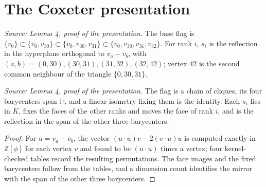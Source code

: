 \section{The Coxeter presentation}

\begin{definition}
  \label{def:walls}
  \leanok
  \textit{Source: Lemma 4, proof of the presentation.}
  The base flag is
  \(\{v_0\}\subset\{v_0,v_{30}\}\subset\{v_0,v_{30},v_{31}\}\subset
  \{v_0,v_{30},v_{31},v_{32}\}\). For rank \(i\), \(s_i\) is the
  reflection in the hyperplane orthogonal to \(v_a-v_b\), with
  \((a,b)=(0,30),(30,31),(31,32),(32,42)\); vertex \(42\) is the second
  common neighbour of the triangle \(\{0,30,31\}\).
\end{definition}

\begin{theorem}
  \label{thm:chamber-walls}
  \leanok
  \textit{Source: Lemma 4, proof of the presentation.}
  The flag is a chain of cliques, its four barycenters span \(\mathbb H\),
  and a linear isometry fixing them is the identity. Each \(s_i\) lies in
  \(K\), fixes the faces of the other ranks and moves the face of rank
  \(i\), and is the reflection in the span of the other three
  barycenters.
\end{theorem}
\begin{proof}
  \leanok
  For \(u=v_a-v_b\), the vector \((u\cdot u)v-2(v\cdot u)u\) is computed
  exactly in \(\mathbb Z[\phi]\) for each vertex \(v\) and found to be
  \((u\cdot u)\) times a vertex; four kernel-checked tables record the
  resulting permutations. The face images and the fixed barycenters follow
  from the tables, and a dimension count identifies the mirror with the
  span of the other three barycenters.
\end{proof}

